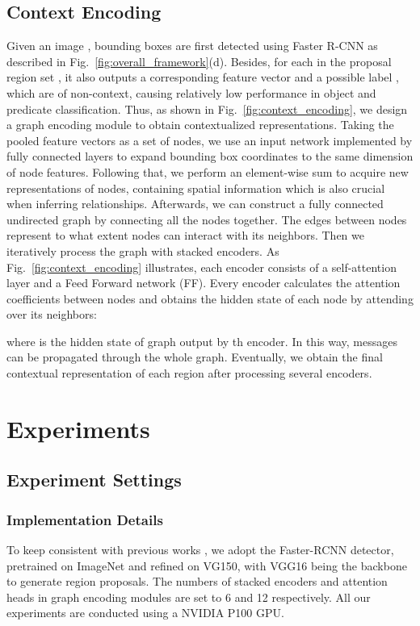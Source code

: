 \documentclass[sigconf]{acmart}
\begin{document}
\begin{table*}[htbp]
\begin{tabular}{cccccccccc}
        \bottomrule
    \end{tabular}
    \label{tab:state-of-the-art}
\end{table*}
\subsection{Context Encoding}
Given an image , bounding boxes are first detected using Faster R-CNN as described in Fig.~\ref{fig:overall_framework}(d). Besides, for each  in the proposal region set , it also outputs a corresponding feature vector and a possible label , which are of non-context, causing relatively low performance in object and predicate classification. Thus, as shown in Fig.~\ref{fig:context_encoding}, we design a graph encoding module to obtain contextualized representations. Taking the pooled feature vectors as a set of nodes, we use an input network implemented by fully connected layers to expand bounding box coordinates to the same dimension of node features. Following that, we perform an element-wise sum to acquire new representations of nodes, containing spatial information which is also crucial when inferring relationships. Afterwards, we can construct a fully connected undirected graph  by connecting all the nodes together. The edges between nodes represent to what extent nodes can interact with its neighbors. Then we iteratively process the graph with stacked encoders. As Fig.~\ref{fig:context_encoding} illustrates, each encoder consists of a self-attention layer and a Feed Forward network (FF). Every encoder calculates the attention coefficients between nodes and obtains the hidden state of each node by attending over its neighbors:


where  is the hidden state of graph  output by th encoder. In this way, messages can be propagated through the whole graph. Eventually, we obtain the final contextual representation of each region after processing several encoders.

\section{Experiments}
\subsection{Experiment Settings}
\subsubsection{Implementation Details}
To keep consistent with previous works \cite{xu17,zellers18,chen19,tang19}, we adopt the Faster-RCNN detector\cite{faster-rcnn}, pretrained on ImageNet\cite{imagenet} and refined on VG150\cite{xu17}, with VGG16\cite{VGG16} being the backbone to generate region proposals. The numbers of stacked encoders and attention heads in graph encoding modules are set to 6 and 12 respectively. All our experiments are conducted using a NVIDIA P100 GPU.
\end{document}

